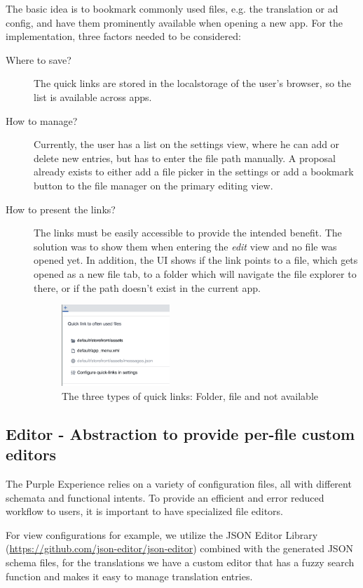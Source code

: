 The basic idea is to bookmark commonly used files, e.g. the translation or ad config, and have them prominently available when opening a new app.
For the implementation, three factors needed to be considered:
\begin{description}
  \item[Where to save?] The quick links are stored in the \Gls{localstorage} of the user's browser, so the list is available across apps.
  \item[How to manage?] Currently, the user has a list on the settings view, where he can add or delete new entries, but has to enter the file path manually.
  A proposal already exists to either add a file picker in the settings or add a bookmark button to the file manager on the primary editing view.
  \item[How to present the links?] The links must be easily accessible to provide the intended benefit. The solution was to show them when entering the \textit{edit} view and no file was opened yet.
  In addition, the UI shows if the link points to a file, which gets opened as a new file tab, to a folder which will navigate the file explorer to there, or if the path doesn't exist in the current app.
  \begin{figure}[h!]
    \centering
    \includegraphics[width=0.4\textwidth]{pics/quick_links.png}
    \caption{The three types of quick links: Folder, file and not available}
  \end{figure}
\end{description}

\subsection{Editor - Abstraction to provide per-file custom editors}

The Purple Experience relies on a variety of configuration files, all with different schemata and functional intents.
To provide an efficient and error reduced workflow to users, it is important to have specialized file editors.

For view configurations for example, we utilize the JSON Editor Library (\url{https://github.com/json-editor/json-editor}) combined with the generated JSON schema files,
for the translations we have a custom editor that has a fuzzy search function and makes it easy to manage translation entries.


